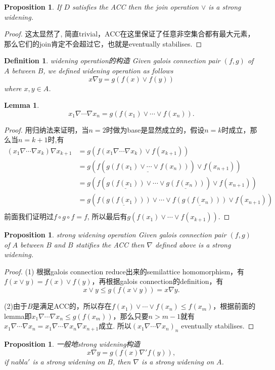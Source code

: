 \documentclass{article}
\newtheorem{lemma}[theorem]{Lemma}
\newtheorem{proposition}[theorem]{Proposition}
\newtheorem{definition}[theorem]{Definition}
\begin{document}
\begin{proposition}
\rm If $D$ satisfies the ACC then the join operation $\vee$ is a strong widening.
\end{proposition}

\begin{proof}
这太显然了, 简直trivial，ACC在这里保证了任意非空集合都有最大元素，那么它们的join肯定不会超过它，也就是eventually stabilises.
\end{proof}

\begin{definition}
\rm {\color{red} widening operation的构造} Given galois connection pair $(f,g)$ of $A$ between $B$, we defined widening operation as follows
$$
x \nabla y = g(f(x) \vee f(y)) 
$$
where $x,y \in A$.
\end{definition}

\begin{lemma}
$$
x_1 \nabla \cdots \nabla x_n = g(f(x_1) \vee \cdots \vee f(x_n)).
$$
\end{lemma}

\begin{proof}
用归纳法来证明，当$n=2$时做为base是显然成立的，假设$n=k$时成立，那么当$n=k+1$时,有
$$
\begin{aligned}
(x_1 \nabla \cdots \nabla x_k) \nabla x_{k+1} &= g(f(x_1 \nabla \cdots \nabla x_k) \vee f(x_{k+1})) \\
&= g(f(\underline{g(f(x_1) \vee \cdots \vee f(x_n))}) \vee f(x_{n+1})) \\
&= g(f( \underline{g(f(x_1))} \vee \cdots \vee \underline{g(f(x_n))}) \vee f(x_{n+1})) \\
&= g(\underline{f(g(f(x_1)))} \vee  \cdots  \vee \underline{f(g(f(x_n)))} \vee  f(x_{n+1})) \\
\end{aligned} 
$$
前面我们证明过$f\circ g \circ f = f$, 所以最后有$ g(f(x_1) \vee \cdots \vee f(x_{k+1}))$.
\end{proof}

\begin{proposition}
\rm {\color{red} strong widening operation} Given galois connection pair $(f,g)$ of $A$ between $B$ and $B$ statifies the ACC then $\nabla$ defined above is a strong widening. 
\end{proposition}

\begin{proof}
(1) 根据galois connection reduce出来的semilattice homomorphism，有$f(x \vee y) = f(x) \vee f(y)$，再根据galois connection的definition，有
$$
 x \vee y \leq g(f(x \vee y)) = x \nabla y.
$$

(2)由于$B$是满足ACC的，所以存在$f(x_1) \vee \cdots \vee f(x_n) \leq f(x_m)$，根据前面的lemma即$x_1 \nabla \cdots \nabla x_n \leq g(f(x_m))$，那么只要$n > m-1$就有$x_1 \nabla \cdots \nabla x_n = x_1 \nabla \cdots \nabla x_n \nabla x_{n+1}$成立. 所以$(x_1 \nabla \cdots \nabla x_n)_n$ eventually stabilises.
\end{proof}

\begin{proposition}
\rm {\color{red} 一般地strong widening构造}
$$
x \nabla y = g(f(x) \nabla' f(y)), 
$$
if $nabla'$ is a strong widening on $B$, then $\nabla$ is a strong widening on $A$.
\end{proposition}
\end{document}

